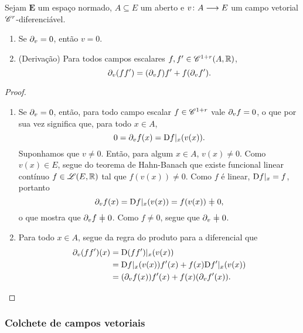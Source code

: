 \begin{proposition}
Sejam $\bm E$ um espaço normado, $A \subseteq E$ um aberto e $v\colon \allowbreak A \longrightarrow E$ um campo vetorial $\mathscr{C}^r$-diferenciável.
	\begin{enumerate}
	\item Se $\partial_{v} = 0$, então $v=0$.
	
	\item (Derivação) Para todos campos escalares $f,f' \in \mathscr{C}^{1+r}(A, \mathbb{R})$,
		\begin{equation*}
		\partial_{v}(ff') = (\partial_{v}f)f' + f(\partial_{v}f').
		\end{equation*}
	\end{enumerate}
\end{proposition}
\begin{proof}
	\begin{enumerate}
	\item Se $\partial_{v} = 0$, então, para todo campo escalar $f \in \mathscr{C}^{1+r}$ vale $\partial_{v} f = 0$, o que por sua vez significa que, para todo $x \in A$,
		\begin{equation*}
		0 = \partial_{v}f(x) = \mathrm{D} f|_x (v(x)).
		\end{equation*}
	Suponhamos que $v \neq 0$. Então, para algum $x \in A$, $v(x) \neq 0$. Como $v(x) \in E$, segue do teorema de Hahn-Banach que existe funcional linear contínuo $f \in \mathscr{L}(E, \mathbb{R})$ tal que $f(v(x)) \neq 0$. Como $f$ é linear, $\mathrm{D} f|_x = f$, portanto
		\begin{equation*}
		\dir{v}f(x) = \D f|_x (v(x)) = f(v(x)) \neq 0,
		\end{equation*}
	o que mostra que $\dir{v}f \neq 0$. Como $f \neq 0$, segue que $\dir{v} \neq 0$.
	 
	\item Para todo $x \in A$, segue da regra do produto para a diferencial que
		\begin{align*}
		\partial_{v}(ff')(x) &= \mathrm{D} (ff')|_x(v(x)) \\
			&= \mathrm{D} f|_x(v(x)) f'(x) + f(x) \mathrm{D} f'|_x(v(x)) \\
			&= (\partial_{v}f(x)) f'(x) + f(x)(\partial_{v} f'(x)).
		\qedhere
		\end{align*}
	\end{enumerate}
\end{proof}


\subsubsection{Colchete de campos vetoriais}

